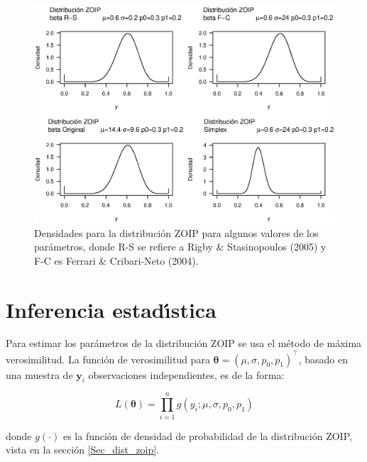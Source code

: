 \begin{figure}
	\begin{center}
		\includegraphics[scale=0.5]{Dist_ZOIP.eps}
		\caption{Densidades para la distribuci\'{o}n ZOIP para algunos valores de los par\'{a}metros, donde R-S se refiere a Rigby \& Stasinopoulos (2005) y F-C es Ferrari \& Cribari-Neto (2004).}
		\label{Dist_ZOIP}
	\end{center}
\end{figure}


\section{Inferencia estad\'{\i}stica}

Para estimar los par\'{a}metros de la distribuci\'{o}n ZOIP se usa el m\'{e}todo de m\'{a}xima verosimilitud. La funci\'{o}n de verosimilitud para $\boldsymbol{\theta}=(\mu, \sigma, p_0, p_1)^{\top}$, basado en una muestra de $\boldsymbol{y}_i$ observaciones independientes, es de la forma:

\begin{equation}
L(\boldsymbol{\theta})=\prod_{i=1}^{n}g(y_i;\mu, \sigma, p_0, p_1) 
\label{F_likel}
\end{equation}

donde $g(\cdot)$ es la funci\'{o}n de densidad de probabilidad de la distribuci\'{o}n ZOIP, vista en la secci\'{o}n \ref{Sec_dist_zoip}.

